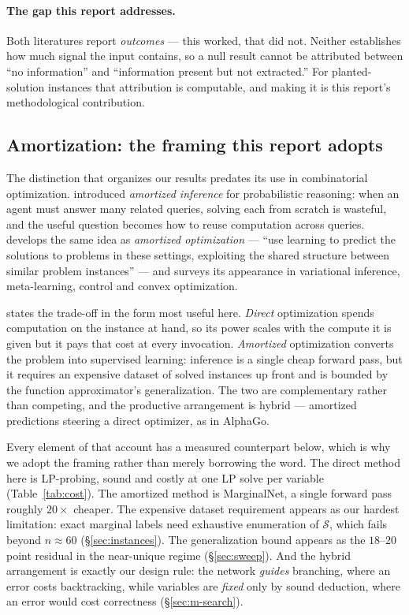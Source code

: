 \documentclass[12pt]{article}
\begin{document}
\paragraph{The gap this report addresses.} Both literatures report \emph{outcomes} --- this worked, that did not. Neither establishes how much signal the input contains, so a null result cannot be attributed between ``no information'' and ``information present but not extracted.'' For planted-solution instances that attribution is computable, and making it is this report's methodological contribution.

\subsection{Amortization: the framing this report adopts}
\label{sec:amort}

The distinction that organizes our results predates its use in combinatorial optimization. \citet{gershman2014amortized} introduced \emph{amortized inference} for probabilistic reasoning: when an agent must answer many related queries, solving each from scratch is wasteful, and the useful question becomes how to reuse computation across queries. \citet{amos2023tutorial} develops the same idea as \emph{amortized optimization} --- ``use learning to predict the solutions to problems in these settings, exploiting the shared structure between similar problem instances'' --- and surveys its appearance in variational inference, meta-learning, control and convex optimization.

\citet{millidge2022deconfusing} states the trade-off in the form most useful here. \emph{Direct} optimization spends computation on the instance at hand, so its power scales with the compute it is given but it pays that cost at every invocation. \emph{Amortized} optimization converts the problem into supervised learning: inference is a single cheap forward pass, but it requires an expensive dataset of solved instances up front and is bounded by the function approximator's generalization. The two are complementary rather than competing, and the productive arrangement is hybrid --- amortized predictions steering a direct optimizer, as in AlphaGo.

Every element of that account has a measured counterpart below, which is why we adopt the framing rather than merely borrowing the word. The direct method here is LP-probing, sound and costly at one LP solve per variable (Table~\ref{tab:cost}). The amortized method is MarginalNet, a single forward pass roughly $20\times$ cheaper. The expensive dataset requirement appears as our hardest limitation: exact marginal labels need exhaustive enumeration of $\mathcal{S}$, which fails beyond $n\approx60$ (\S\ref{sec:instances}). The generalization bound appears as the $18$--$20$ point residual in the near-unique regime (\S\ref{sec:sweep}). And the hybrid arrangement is exactly our design rule: the network \emph{guides} branching, where an error costs backtracking, while variables are \emph{fixed} only by sound deduction, where an error would cost correctness (\S\ref{sec:m-search}).
\end{document}
